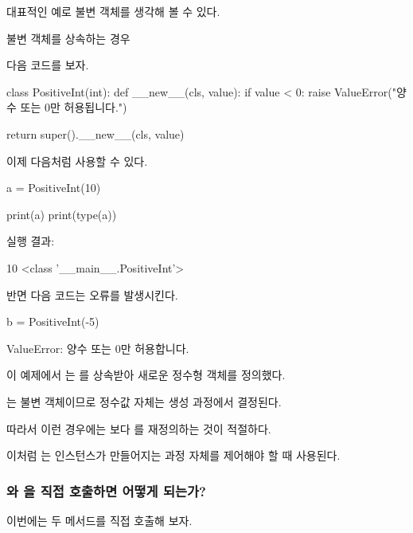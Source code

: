 대표적인 예로 불변 객체를 생각해 볼 수 있다.

\begin{dhknote}
\begin{dhksmry}[centered]
불변 객체를 상속하는 경우
\end{dhksmry}
\end{dhknote}

다음 코드를 보자.

\begin{dhkcode}
class PositiveInt(int):
    def __new__(cls, value):
        if value < 0:
            raise ValueError("양수 또는 0만 허용됩니다.")

    return super().__new__(cls, value)
\end{dhkcode}

이제 다음처럼 사용할 수 있다.

\begin{dhkcode}
a = PositiveInt(10)

print(a)
print(type(a))
\end{dhkcode}

실행 결과:

\begin{dhkzsh}
10
<class '__main__.PositiveInt'>
\end{dhkzsh}

반면 다음 코드는 오류를 발생시킨다.

\begin{dhkcode}
b = PositiveInt(-5)
\end{dhkcode}

\begin{dhkzsh}
ValueError: 양수 또는 0만 허용합니다.
\end{dhkzsh}

이 예제에서 는 를 상속받아 새로운 정수형 객체를 정의했다.

는 불변 객체이므로 정수값 자체는 생성 과정에서 결정된다.

따라서 이런 경우에는  보다 를 재정의하는 것이 적절하다.

이처럼 는 인스턴스가 만들어지는 과정 자체를 제어해야 할 때 사용된다.

\subsubsection{와 을 직접 호출하면 어떻게 되는가?}

이번에는 두 메서드를 직접 호출해 보자.

